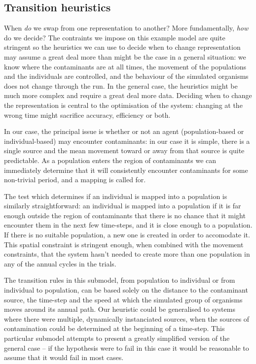 \documentclass{article}
\newcommand{\tmem}[1]{{\em #1\/}}
\begin{document}
\subsection{Transition heuristics}

When {\tmem{do}} we swap from one representation to another? More
fundamentally, {\tmem{how}} do we decide? The contraints we impose on this
example model are quite stringent so the heuristics we can use to decide when
to change representation may assume a great deal more than might be the case
in a general situation: we know where the contaminants are at all times, the
movement of the populations and the individuals are controlled, and the
behaviour of the simulated organisms does not change through the run. In the
general case, the heuristics might be much more complex and require a great
deal more data. Deciding when to change the representation is central to the
optimisation of the system: changing at the wrong time might sacrifice
accuracy, efficiency or both.

In our case, the principal issue is whether or not an agent (population-based
or individual-based) may encounter contaminants: in our case it is simple,
there is a single source and the mean movement toward or away from that source
is quite predictable. As a population enters the region of contaminants we can
immediately determine that it will consistently encounter contaminants for
some non-trivial period, and a mapping is called for.

The test which determines if an individual is mapped into a population is
similarly straightforward: an individual is mapped into a population if it is
far enough outside the region of contaminants that there is no chance that it
might encounter them in the next few time-steps, and it is close enough to a
population. If there is no suitable population, a new one is created in order
to accomodate it. This spatial constraint is stringent enough, when combined
with the movement constraints, that the system hasn't needed to create more
than one population in any of the annual cycles in the trials.

The transition rules in this submodel, from population to individual or from
individual to population, can be based solely on the distance to the
contaminant source, the time-step and the speed at which the simulated group
of organisms moves around its annual path. Our heuristic could be generalised
to systems where there were multiple, dynamically instanciated sources, when
the sources of contamination could be determined at the beginning of a
time-step. This particular submodel attempts to present a greatly simplified
version of the general case -- if the hypothesis were to fail in this case it
would be reasonable to assume that it would fail in most cases.
\end{document}
